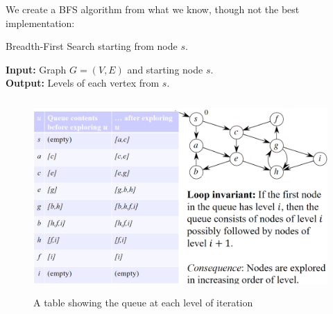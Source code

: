 \newpage 

\noindent
We create a BFS algorithm from what we know, though not the best implementation:
\begin{Func}
    Breadth-First Search starting from node $s$.
    
    \vspace{.5em}
    \noindent
    \textbf{Input:} Graph $G = (V, E)$ and starting node $s$.\\
    \textbf{Output:} Levels of each vertex from $s$.\\
    \begin{algorithm}[H]
        \SetAlgoLined
    \end{algorithm}
\end{Func}
\vspace{-2em}
\begin{figure}[h]
    \begin{center}
      \includegraphics[height=2.9in]{./Sections/graphs/bfs_q.png}
    \end{center}
     \caption{A table showing the queue at each level of iteration}\label{fig:bfs_q}
  \end{figure}

